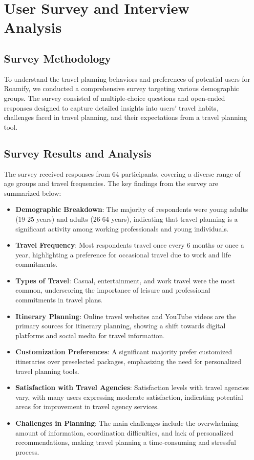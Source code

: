 \documentclass[conference]{IEEEtran}
\begin{document}
\section{User Survey and Interview Analysis}

\subsection{Survey Methodology}
To understand the travel planning behaviors and preferences of potential users for Roamify, we conducted a comprehensive survey targeting various demographic groups. The survey consisted of multiple-choice questions and open-ended responses designed to capture detailed insights into users' travel habits, challenges faced in travel planning, and their expectations from a travel planning tool.

\subsection{Survey Results and Analysis}
The survey received responses from 64 participants, covering a diverse range of age groups and travel frequencies. The key findings from the survey are summarized below:

\begin{itemize}
    \item \textbf{Demographic Breakdown}: The majority of respondents were young adults (19-25 years) and adults (26-64 years), indicating that travel planning is a significant activity among working professionals and young individuals.
    \item \textbf{Travel Frequency}: Most respondents travel once every 6 months or once a year, highlighting a preference for occasional travel due to work and life commitments.
    \item \textbf{Types of Travel}: Casual, entertainment, and work travel were the most common, underscoring the importance of leisure and professional commitments in travel plans.
    \item \textbf{Itinerary Planning}: Online travel websites and YouTube videos are the primary sources for itinerary planning, showing a shift towards digital platforms and social media for travel information.
    \item \textbf{Customization Preferences}: A significant majority prefer customized itineraries over preselected packages, emphasizing the need for personalized travel planning tools.
    \item \textbf{Satisfaction with Travel Agencies}: Satisfaction levels with travel agencies vary, with many users expressing moderate satisfaction, indicating potential areas for improvement in travel agency services.
    \item \textbf{Challenges in Planning}: The main challenges include the overwhelming amount of information, coordination difficulties, and lack of personalized recommendations, making travel planning a time-consuming and stressful process.
\end{itemize}
\end{document}
